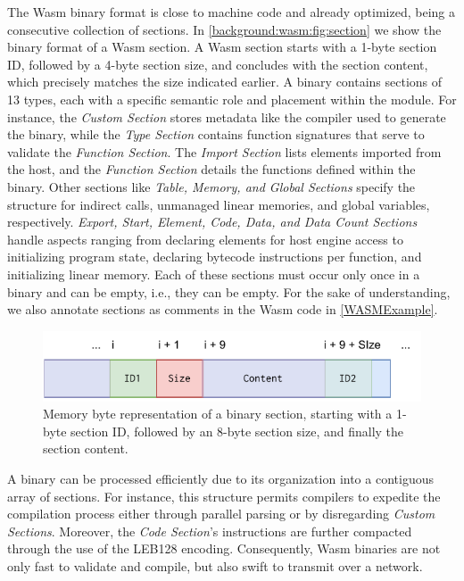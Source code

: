 \label{background:wasm:binary}

The Wasm binary format is close to machine code and already optimized, being a consecutive collection of sections.
In \autoref{background:wasm:fig:section} we show the binary format of a Wasm section.
A Wasm section starts with a 1-byte section ID, followed by a 4-byte section size, and concludes with the section content, which precisely matches the size indicated earlier.
A \wasm binary contains sections of 13 types, each with a specific semantic role and placement within the module. 
For instance, the \emph{Custom Section} stores metadata like the compiler used to generate the binary, while the \emph{Type Section} contains function signatures that serve to validate the \emph{Function Section}. 
The \emph{Import Section} lists elements imported from the host, and the \emph{Function Section} details the functions defined within the binary. 
Other sections like \emph{Table, Memory, and Global Sections} specify the structure for indirect calls, unmanaged linear memories, and global variables, respectively. 
\emph{Export, Start, Element, Code, Data, and Data Count Sections} handle aspects ranging from declaring elements for host engine access to initializing program state, declaring bytecode instructions per function, and initializing linear memory. 
Each of these sections must occur only once in a binary and can be empty, i.e., they can be empty.
For the sake of understanding, we also annotate sections as comments in the Wasm code in \autoref{WASMExample}.
    

\begin{figure}[h]
    \centering
    \includegraphics[width=0.5\linewidth]{figures/section.pdf}
    \caption{Memory byte representation of a \Wasm binary section, starting with a 1-byte section ID, followed by an 8-byte section size, and finally the section content.}
    \label{background:wasm:fig:section}
\end{figure}

A \wasm binary can be processed efficiently due to its organization into a contiguous array of sections. 
For instance, this structure permits compilers to expedite the compilation process either through parallel parsing or by disregarding \emph{Custom Sections}. 
Moreover, the \emph{Code Section}'s instructions are further compacted through the use of the LEB128 encoding. 
Consequently, Wasm binaries are not only fast to validate and compile, but also swift to transmit over a network.

